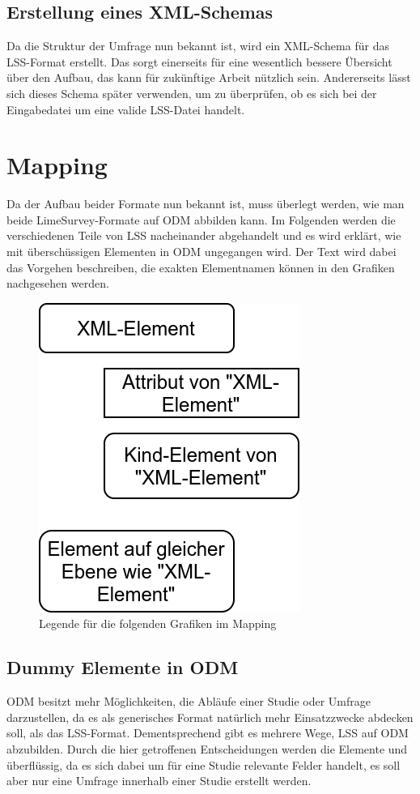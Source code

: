 \subsection{Erstellung eines XML-Schemas}
\label{an:xsd}
Da die Struktur der Umfrage nun bekannt ist, wird ein XML-Schema für das LSS-Format erstellt.
Das sorgt einerseits für eine wesentlich bessere Übersicht über den Aufbau, das kann für zukünftige Arbeit nützlich sein.
Andererseits lässt sich dieses Schema später verwenden, um zu überprüfen, ob es sich bei der Eingabedatei um eine valide LSS-Datei handelt.

\section{Mapping}

Da der Aufbau beider Formate nun bekannt ist, muss überlegt werden, wie man beide LimeSurvey-Formate auf ODM abbilden kann. Im Folgenden werden die verschiedenen Teile von LSS nacheinander abgehandelt und es wird erklärt, wie mit überschüssigen Elementen in ODM ungegangen wird.
Der Text wird dabei das Vorgehen beschreiben, die exakten Elementnamen können in den Grafiken nachgesehen werden.

\begin{figure}[h]
			\centering
			\includegraphics[width=.30\textwidth]{./img/legend.png}
			\caption{Legende für die folgenden Grafiken im Mapping}
\end{figure}

\subsection{Dummy Elemente in ODM}

ODM besitzt mehr Möglichkeiten, die Abläufe einer Studie oder Umfrage darzustellen, da es als generisches Format natürlich mehr Einsatzzwecke abdecken soll, als das LSS-Format.
Dementsprechend gibt es mehrere Wege, LSS auf ODM abzubilden.
Durch die hier getroffenen Entscheidungen werden die Elemente  und  überflüssig,	da es sich dabei um für eine Studie relevante Felder handelt, es soll aber nur eine Umfrage innerhalb einer Studie erstellt werden.\\


